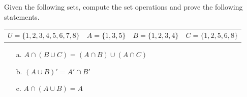 \documentclass[a4paper,12pt]{book}
\newcounter{question}
\begin{document}
        \begin{questionNOGRADE}{\thequestion}

            Given the following sets, compute the set operations and prove
            the following statements.

            \begin{tabular}{l l l l}
                $U = \{1, 2, 3, 4, 5, 6, 7, 8 \} $ &
                $A = \{1, 3, 5\}$ &
                $B = \{1, 2, 3, 4\}$ &
                $C = \{1, 2, 5, 6, 8\}$
            \end{tabular}

            \begin{enumerate}
                \item[a.]   $A \cap (B \cup C) = (A \cap B) \cup (A \cap C)$

                \item[b.]   $(A \cup B)' = A' \cap B'$

                \item[c.]   $A \cap (A \cup B) = A$
            \end{enumerate}

        \end{questionNOGRADE}
\end{document}

